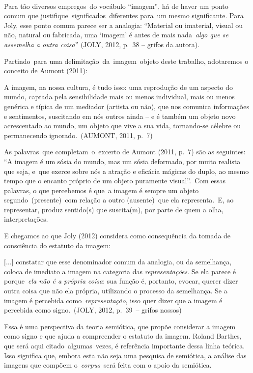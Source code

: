 \documentclass[
  letterpaper,
  a4paper,
  12pt]{scrbook}
\renewenvironment{quote}
  {\par\singlespacing\small\list{}{\rightmargin=0cm \leftmargin=4cm}%
   \item\relax}
  {\endlist}
\begin{document}
~

Para tão diversos empregos~do vocábulo ``imagem'', há de haver um ponto
comum que justifique~significados~diferentes para~um mesmo significante.
Para Joly, esse ponto comum parece ser a analogia: ``Material ou
imaterial, visual ou não, natural ou fabricada, uma `imagem' é antes de
mais nada~\emph{algo que se assemelha a outra coisa}'' (JOLY, 2012,
p.~38 -- grifos da autora).~

Partindo~para uma delimitação~da~imagem~objeto deste trabalho,
adotaremos o conceito de Aumont (2011):~ ~

\begin{quote}
A imagem, na nossa cultura, é tudo isso: uma reprodução de um aspecto do
mundo, captada pela sensibilidade mais ou menos individual, mais ou
menos genérica e típica de um mediador (artista ou não), que nos
comunica informações e sentimentos, suscitando em nós outros ainda -- e
é também um objeto novo acrescentado ao mundo, um objeto que vive a sua
vida, tornando-se célebre ou permanecendo ignorado.~(AUMONT, 2011,
p.~7)~ ~
\end{quote}

As palavras~que completam~o~excerto de Aumont (2011, p.~7) são as
seguintes: ``A imagem é um sósia do mundo, mas um sósia deformado, por
muito realista que seja, e~que exerce sobre nós a atração e eficácia
mágicas do duplo, ao mesmo tempo que o encanto próprio de um objeto
puramente visual''.~Com essas palavras, o que percebemos é que~a imagem
é sempre um objeto segundo~(presente)~com relação a outro (ausente)~que
ela representa.~E, ao representar, produz sentido(s) que suscita(m), por
parte de quem a olha, interpretações.~

E chegamos ao que Joly (2012) considera como consequência da tomada de
consciência do estatuto da imagem: ~

\begin{quote}
{[}...{]} constatar que esse denominador comum da analogia, ou da
semelhança, coloca de imediato a imagem na categoria das
\emph{representações}. Se ela parece é porque~\emph{ela não é a própria
coisa}: sua função é, portanto, evocar, querer dizer outra coisa que não
ela própria, utilizando o processo da semelhança. Se a imagem é
percebida como~\emph{representação}, isso quer dizer que a imagem é
percebida como signo.~(JOLY, 2012, p.~39~-- grifos nossos)~ ~
\end{quote}

Essa é uma perspectiva da teoria semiótica, que propõe considerar a
imagem como signo e que ajuda a compreender o estatuto da imagem. Roland
Barthes, que será aqui citado~algumas~vezes, é referência importante
dessa linha teórica. Isso significa que, embora esta não seja uma
pesquisa de semiótica, a análise das imagens que compõem
o~\emph{corpus}~será feita com o apoio da semiótica.~
\end{document}
